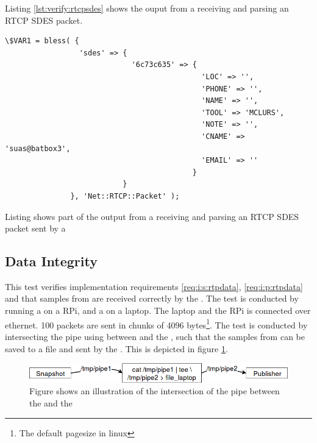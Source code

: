 Listing \ref{lst:verify:rtcpsdes} shows the ouput from a \sub{} receiving and parsing an RTCP SDES packet.

\begin{listing}[h] 
\begin{verbatim}
\$VAR1 = bless( {
                 'sdes' => {
                             '6c73c635' => {
                                             'LOC' => '',
                                             'PHONE' => '',
                                             'NAME' => '',
                                             'TOOL' => 'MCLURS',
                                             'NOTE' => '',
                                             'CNAME' => 'suas@batbox3',
                                             'EMAIL' => ''
                                           }
                           }
               }, 'Net::RTCP::Packet' );
\end{verbatim}
\caption{Listing shows part of the output from a \sub{} receiving and parsing an RTCP SDES packet sent by a \pub{}}
\label{lst:verify:rtcpsdes}
\end{listing}


\subsection{Data Integrity} \label{sec:verify:dataintegrity}
This test verifies implementation requirements \ref{req:i:s:rtpdata}, \ref{req:i:p:rtpdata} and that samples from  are received correctly by the \con{}.
The test is conducted by running a \pub{} on a \ac{RPi}, and a \sub{} on a laptop. The laptop and the \ac{RPi} is connected over ethernet. 100 packets are sent in chunks of 4096 bytes\footnote{The default pagesize in linux}. The test is conducted by intersecting the pipe using  between  and the , such that the samples from  can be saved to a file and sent by the \pub{}. This is depicted in figure \ref{fig:verify:dataintegrity:sketch}.

\begin{figure}[H]
	\centering
	\includegraphics[width=\textwidth]{figures/dataintegrityverify.png}
	\caption{Figure shows an illustration of the intersection of the pipe between the  and the \pub{}} \label{fig:verify:dataintegrity:sketch}
\end{figure}

